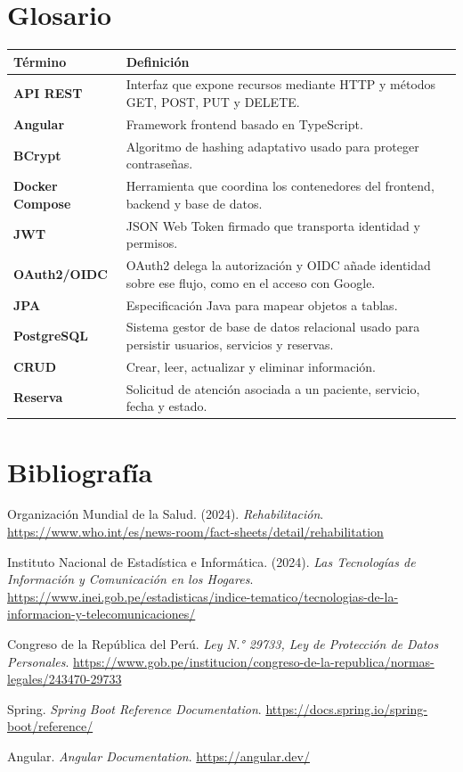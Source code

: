 \documentclass[12pt,a4paper,oneside]{report}
\begin{document}
\section{Glosario}
\begin{tabularx}{\textwidth}{|>{\raggedright\arraybackslash\bfseries}p{3.7cm}|Y|}
\hline
{}\color{white}\textbf{Término} & \color{white}\textbf{Definición}\\
\hline
API REST & Interfaz que expone recursos mediante HTTP y métodos GET, POST, PUT y DELETE.\\
\hline
Angular & Framework frontend basado en TypeScript.\\
\hline
BCrypt & Algoritmo de hashing adaptativo usado para proteger contraseñas.\\
\hline
Docker Compose & Herramienta que coordina los contenedores del frontend, backend y base de datos.\\
\hline
JWT & JSON Web Token firmado que transporta identidad y permisos.\\
\hline
OAuth2/OIDC & OAuth2 delega la autorización y OIDC añade identidad sobre ese flujo, como en el acceso con Google.\\
\hline
JPA & Especificación Java para mapear objetos a tablas.\\
\hline
PostgreSQL & Sistema gestor de base de datos relacional usado para persistir usuarios, servicios y reservas.\\
\hline
CRUD & Crear, leer, actualizar y eliminar información.\\
\hline
Reserva & Solicitud de atención asociada a un paciente, servicio, fecha y estado.\\
\hline
\end{tabularx}

\clearpage
\section{Bibliografía}
\begin{enumerate}[label={\textcolor{CibertecAccent}{[\arabic*]}},leftmargin=1.1cm,itemsep=7pt]
\item Organización Mundial de la Salud. (2024). \textit{Rehabilitación}. \url{https://www.who.int/es/news-room/fact-sheets/detail/rehabilitation}
\item Instituto Nacional de Estadística e Informática. (2024). \textit{Las Tecnologías de Información y Comunicación en los Hogares}. \url{https://www.inei.gob.pe/estadisticas/indice-tematico/tecnologias-de-la-informacion-y-telecomunicaciones/}
\item Congreso de la República del Perú. \textit{Ley N.° 29733, Ley de Protección de Datos Personales}. \url{https://www.gob.pe/institucion/congreso-de-la-republica/normas-legales/243470-29733}
\item Spring. \textit{Spring Boot Reference Documentation}. \url{https://docs.spring.io/spring-boot/reference/}
\item Angular. \textit{Angular Documentation}. \url{https://angular.dev/}
\end{enumerate}
\end{document}
